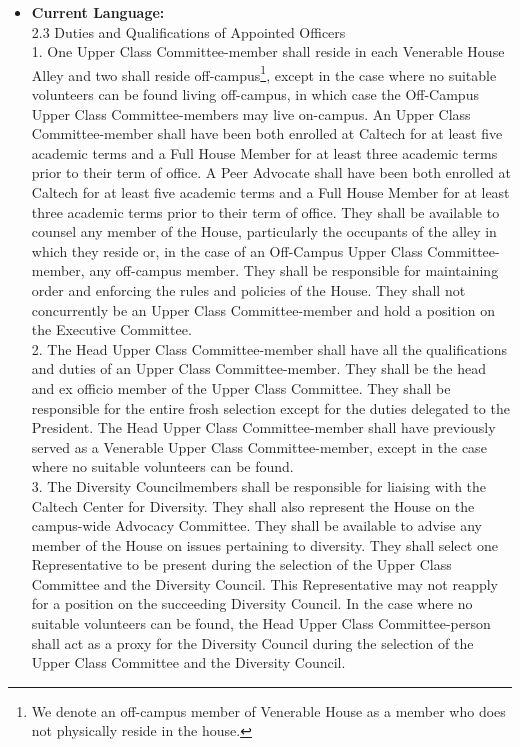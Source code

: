 \documentclass[10pt]{article} %
\begin{document}
\begin{itemize}
    \item \textbf{Current Language:} \\
        2.3 Duties and Qualifications of Appointed Officers \\
        1. One Upper Class Committee-member shall reside in each Venerable House Alley and two shall reside off-campus\footnote{We denote an off-campus member of Venerable House as a member who does not physically reside in the house.}, except in the case where no suitable volunteers can be found living off-campus, in which case the Off-Campus Upper Class Committee-members may live on-campus. An Upper Class Committee-member shall have been both enrolled at Caltech for at least five academic terms and a Full House Member for at least three academic terms prior to their term of office. A Peer Advocate shall have been both enrolled at Caltech for at least five academic terms and a Full House Member for at least three academic terms prior to their term of office. They shall be available to counsel any member of the House, particularly the occupants of the alley in which they reside or, in the case of an Off-Campus Upper Class Committee-member, any off-campus member. They shall be responsible for maintaining order and enforcing the rules and policies of the House. They shall not concurrently be an Upper Class Committee-member and hold a position on the Executive Committee. \\
        2. The Head Upper Class Committee-member shall have all the qualifications and duties of an Upper Class Committee-member. They shall be the head and ex officio member of the Upper Class Committee. They shall be responsible for the entire frosh selection except for the duties delegated to the President. The Head Upper Class Committee-member shall have previously served as a Venerable Upper Class Committee-member, except in the case where no suitable volunteers can be found. \\
        3. The Diversity Councilmembers shall be responsible for liaising with the Caltech Center for Diversity. They shall also represent the House on the campus-wide Advocacy Committee. They shall be available to advise any member of the House on issues pertaining to diversity. They shall select one Representative to be present during the selection of the Upper Class Committee and the Diversity Council. This Representative may not reapply for a position on the succeeding Diversity Council. In the case where no suitable volunteers can be found, the Head Upper Class Committee-person shall act as a proxy for the Diversity Council during the selection of the Upper Class Committee and the Diversity Council. \\

\end{itemize}
\end{document}
